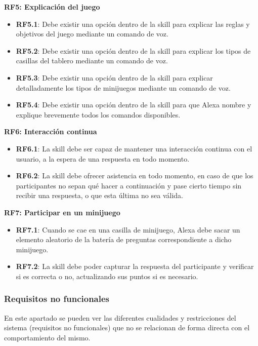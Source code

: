 \textbf{RF5: Explicación del juego}
\begin{itemize}
    \item \textbf{RF5.1}: Debe existir una opción dentro de la skill para explicar las reglas y objetivos del juego mediante un comando de voz.
    \item \textbf{RF5.2}: Debe existir una opción dentro de la skill para explicar los tipos de casillas del tablero mediante un comando de voz.
    \item \textbf{RF5.3}: Debe existir una opción dentro de la skill para explicar detalladamente los tipos de minijuegos mediante un comando de voz.
    \item \textbf{RF5.4}: Debe existir una opción dentro de la skill para que Alexa nombre y explique brevemente todos los comandos disponibles.
\end{itemize}

\textbf{RF6: Interacción continua}
\begin{itemize}
	\item \textbf{RF6.1}: La skill debe ser capaz de mantener una interacción continua con el usuario, a la espera de una respuesta en todo momento.
    \item \textbf{RF6.2}: La skill debe ofrecer asistencia en todo momento, en caso de que los participantes no sepan qué hacer a continuación y pase cierto tiempo sin recibir una respuesta, o que esta última no sea válida.
\end{itemize}

\textbf{RF7: Participar en un minijuego}
\begin{itemize}
	\item \textbf{RF7.1}: Cuando se cae en una casilla de minijuego, Alexa debe sacar un elemento aleatorio de la batería de preguntas correspondiente a dicho minijuego.
	\item \textbf{RF7.2}: La skill debe poder capturar la respuesta del participante y verificar si es correcta o no, actualizando sus puntos si es necesario.
\end{itemize}


\subsubsection{Requisitos no funcionales}

En este apartado se pueden ver las diferentes cualidades y restricciones del sistema (requisitos no funcionales) que no se relacionan de forma directa con el comportamiento del mismo.
\vspace{0.3cm}


